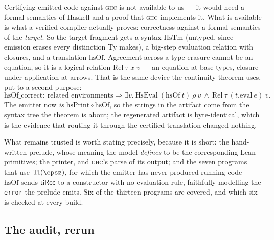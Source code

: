 Certifying emitted code against \textsc{ghc} is not available to us --- it
would need a formal semantics of Haskell and a proof that \textsc{ghc}
implements it. What is available is what a verified compiler actually proves:
correctness against a formal semantics of the \emph{target}. So the target
fragment gets a syntax $\mathrm{HsTm}$ (untyped, since emission erases every
distinction $\mathrm{Ty}$ makes), a big-step evaluation relation with closures, and a
translation $\mathrm{hsOf}$. Agreement across a type erasure cannot be an
equation, so it is a logical relation $\mathrm{Rel}\;\tau\;x\;v$ --- an
equation at base types, closure under application at arrows. That is the same
device the continuity theorem uses, put to a second purpose:
\[
  \mathrm{hsOf\_correct} :\ \text{related environments} \Rightarrow
  \exists v.\ \mathrm{HsEval}\ (\mathrm{hsOf}\ t)\ \rho\ v \ \wedge\
  \mathrm{Rel}\ \tau\ (t.\mathrm{eval}\ e)\ v .
\]
The emitter now \emph{is} $\mathrm{hsPrint} \circ \mathrm{hsOf}$, so the
strings in the artifact come from the syntax tree the theorem is about; the
regenerated artifact is byte-identical, which is the evidence that routing it
through the certified translation changed nothing.

What remains trusted is worth stating precisely, because it is short: the
hand-written prelude, whose meaning the model \emph{defines} to be the
corresponding Lean primitives; the printer, and \textsc{ghc}'s parse of its
output; and the seven programs that use $\mathrm{TI}(\epsz)$, for which the
emitter has never produced running code --- $\mathrm{hsOf}$ sends
$\mathsf{tiRec}$ to a constructor with no evaluation rule, faithfully
modelling the \texttt{error} the prelude emits. Six of the thirteen programs
are covered, and which six is checked at every build.

\subsection*{The audit, rerun}

